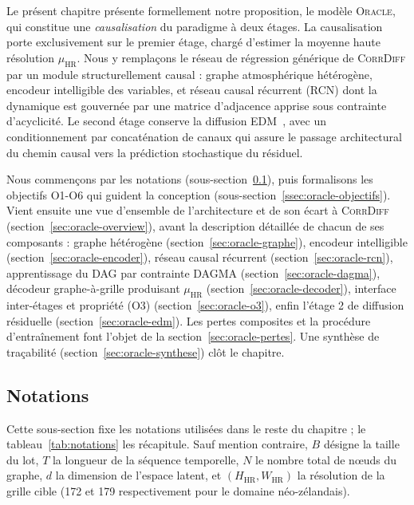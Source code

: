 \documentclass[14pt,a4paper,openany]{extreport}
\theoremstyle{definition}
\newcommand{\Oracle}{\textsc{Oracle}}
\newcommand{\CorrDiff}{\textsc{CorrDiff}}
\newcommand{\HR}{\ensuremath{\text{HR}}}
\newcommand{\muHR}{\ensuremath{\mu_{\HR}}}
\begin{document}
Le présent chapitre présente formellement notre proposition, le modèle \Oracle{}, qui constitue une \emph{causalisation} du paradigme à deux étages. La causalisation porte exclusivement sur le premier étage, chargé d'estimer la moyenne haute résolution $\muHR$. Nous y remplaçons le réseau de régression générique de \CorrDiff{} par un module structurellement causal : graphe atmosphérique hétérogène, encodeur intelligible des variables, et réseau causal récurrent (RCN) dont la dynamique est gouvernée par une matrice d'adjacence apprise sous contrainte d'acyclicité. Le second étage conserve la diffusion EDM~\cite{karras_edm_2022}, avec un conditionnement par concaténation de canaux qui assure le passage architectural du chemin causal vers la prédiction stochastique du résiduel.

Nous commençons par les notations (sous-section~\ref{ssec:oracle-notations}), puis formalisons les objectifs O1-O6 qui guident la conception (sous-section~\ref{ssec:oracle-objectifs}). Vient ensuite une vue d'ensemble de l'architecture et de son écart à \CorrDiff{} (section~\ref{sec:oracle-overview}), avant la description détaillée de chacun de ses composants : graphe hétérogène (section~\ref{sec:oracle-graphe}), encodeur intelligible (section~\ref{sec:oracle-encoder}), réseau causal récurrent (section~\ref{sec:oracle-rcn}), apprentissage du DAG par contrainte DAGMA (section~\ref{sec:oracle-dagma}), décodeur graphe-à-grille produisant $\muHR$ (section~\ref{sec:oracle-decoder}), interface inter-étages et propriété (O3) (section~\ref{sec:oracle-o3}), enfin l'étage 2 de diffusion résiduelle (section~\ref{sec:oracle-edm}). Les pertes composites et la procédure d'entraînement font l'objet de la section~\ref{sec:oracle-pertes}. Une synthèse de traçabilité (section~\ref{sec:oracle-synthese}) clôt le chapitre.

\subsection{Notations}
\label{ssec:oracle-notations}

Cette sous-section fixe les notations utilisées dans le reste du chapitre ; le tableau~\ref{tab:notations} les récapitule. Sauf mention contraire, $B$ désigne la taille du lot, $T$ la longueur de la séquence temporelle, $N$ le nombre total de nœuds du graphe, $d$ la dimension de l'espace latent, et $(H_{\HR}, W_{\HR})$ la résolution de la grille cible (172 et 179 respectivement pour le domaine néo-zélandais).
\end{document}
